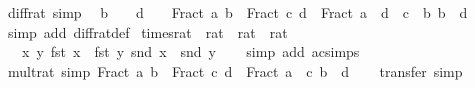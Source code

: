 \begin{isabellebody}
\isanewline
{}\isamarkupfalse%
\ diff{\isacharunderscore}{\kern0pt}rat\ {\isacharbrackleft}{\kern0pt}simp{\isacharbrackright}{\kern0pt}{\isacharcolon}{\kern0pt}\isanewline
\ \ {\isachardoublequoteopen}b\ {\isasymnoteq}\ {}\ {\isasymLongrightarrow}\ d\ {\isasymnoteq}\ {}\ {\isasymLongrightarrow}\ Fract\ a\ b\ {\isacharminus}{\kern0pt}\ Fract\ c\ d\ {\isacharequal}{\kern0pt}\ Fract\ {\isacharparenleft}{\kern0pt}a\ {\isacharasterisk}{\kern0pt}\ d\ {\isacharminus}{\kern0pt}\ c\ {\isacharasterisk}{\kern0pt}\ b{\isacharparenright}{\kern0pt}\ {\isacharparenleft}{\kern0pt}b\ {\isacharasterisk}{\kern0pt}\ d{\isacharparenright}{\kern0pt}{\isachardoublequoteclose}\isanewline
%
\isadelimproof
\ \ %
\endisadelimproof
%
\isatagproof
{}\isamarkupfalse%
\ {\isacharparenleft}{\kern0pt}simp\ add{\isacharcolon}{\kern0pt}\ diff{\isacharunderscore}{\kern0pt}rat{\isacharunderscore}{\kern0pt}def{\isacharparenright}{\kern0pt}%
\endisatagproof
{\isafoldproof}%
%
\isadelimproof
\isanewline
%
\endisadelimproof
\isanewline
{}\isamarkupfalse%
\ times{\isacharunderscore}{\kern0pt}rat\ {\isacharcolon}{\kern0pt}{\isacharcolon}{\kern0pt}\ {\isachardoublequoteopen}rat\ {\isasymRightarrow}\ rat\ {\isasymRightarrow}\ rat{\isachardoublequoteclose}\isanewline
\ \ \ {\isachardoublequoteopen}{\isasymlambda}x\ y{\isachardot}{\kern0pt}\ {\isacharparenleft}{\kern0pt}fst\ x\ {\isacharasterisk}{\kern0pt}\ fst\ y{\isacharcomma}{\kern0pt}\ snd\ x\ {\isacharasterisk}{\kern0pt}\ snd\ y{\isacharparenright}{\kern0pt}{\isachardoublequoteclose}\isanewline
%
\isadelimproof
\ \ %
\endisadelimproof
%
\isatagproof
{}\isamarkupfalse%
\ {\isacharparenleft}{\kern0pt}simp\ add{\isacharcolon}{\kern0pt}\ ac{\isacharunderscore}{\kern0pt}simps{\isacharparenright}{\kern0pt}%
\endisatagproof
{\isafoldproof}%
%
\isadelimproof
\isanewline
%
\endisadelimproof
\isanewline
{}\isamarkupfalse%
\ mult{\isacharunderscore}{\kern0pt}rat\ {\isacharbrackleft}{\kern0pt}simp{\isacharbrackright}{\kern0pt}{\isacharcolon}{\kern0pt}\ {\isachardoublequoteopen}Fract\ a\ b\ {\isacharasterisk}{\kern0pt}\ Fract\ c\ d\ {\isacharequal}{\kern0pt}\ Fract\ {\isacharparenleft}{\kern0pt}a\ {\isacharasterisk}{\kern0pt}\ c{\isacharparenright}{\kern0pt}\ {\isacharparenleft}{\kern0pt}b\ {\isacharasterisk}{\kern0pt}\ d{\isacharparenright}{\kern0pt}{\isachardoublequoteclose}\isanewline
%
\isadelimproof
\ \ %
\endisadelimproof
%
\isatagproof
{}\isamarkupfalse%
\ transfer\ simp%
\endisatagproof
{\isafoldproof}%

\end{isabellebody}
